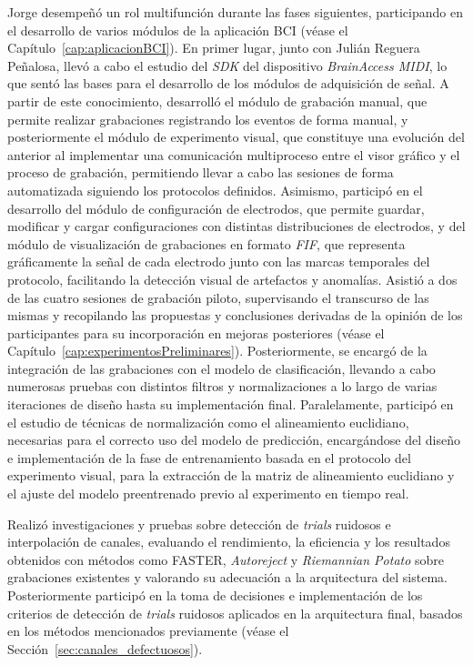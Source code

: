 Jorge desempeñó un rol multifunción durante las fases siguientes, participando 
en el desarrollo de varios módulos de la aplicación BCI 
(véase el Capítulo~\ref{cap:aplicacionBCI}). En primer lugar, junto con Julián 
Reguera Peñalosa, llevó a cabo el estudio del \textit{SDK} del dispositivo 
\textit{BrainAccess MIDI}, lo que sentó las bases para el desarrollo de los 
módulos de adquisición de señal. A partir de este conocimiento, desarrolló el 
módulo de grabación manual, que permite realizar grabaciones registrando los 
eventos de forma manual, y posteriormente el módulo de experimento visual, que 
constituye una evolución del anterior al implementar una comunicación multiproceso 
entre el visor gráfico y el proceso de grabación, permitiendo llevar a cabo las 
sesiones de forma automatizada siguiendo los protocolos definidos. Asimismo, 
participó en el desarrollo del módulo de configuración de electrodos, que permite 
guardar, modificar y cargar configuraciones con distintas distribuciones de 
electrodos, y del módulo de visualización de grabaciones en formato \textit{FIF}, 
que representa gráficamente la señal de cada electrodo junto con las marcas 
temporales del protocolo, facilitando la detección visual de artefactos y 
anomalías. Asistió a dos de las cuatro sesiones de grabación piloto, supervisando 
el transcurso de las mismas y recopilando las propuestas y conclusiones derivadas 
de la opinión de los participantes para su incorporación en mejoras posteriores (véase el Capítulo~\ref{cap:experimentosPreliminares}). 
Posteriormente, se encargó de la integración de las grabaciones con el modelo de 
clasificación, llevando a cabo numerosas pruebas con distintos filtros y 
normalizaciones a lo largo de varias iteraciones de diseño hasta su 
implementación final. Paralelamente, participó en el estudio de técnicas de 
normalización como el alineamiento euclidiano, necesarias para el correcto uso 
del modelo de predicción, encargándose del diseño e implementación de la fase de 
entrenamiento basada en el protocolo del experimento visual, para la extracción 
de la matriz de alineamiento euclidiano y el ajuste del modelo preentrenado 
previo al experimento en tiempo real.

Realizó investigaciones y pruebas sobre detección de \textit{trials} ruidosos e 
interpolación de canales, evaluando el rendimiento, la eficiencia y los resultados 
obtenidos con métodos como FASTER, \textit{Autoreject} y \textit{Riemannian Potato} 
sobre grabaciones existentes y valorando su adecuación a la arquitectura del 
sistema. Posteriormente participó en la toma de decisiones e implementación de 
los criterios de detección de \textit{trials} ruidosos aplicados en la arquitectura 
final, basados en los métodos mencionados previamente 
(véase el Sección~\ref{sec:canales_defectuosos}).


